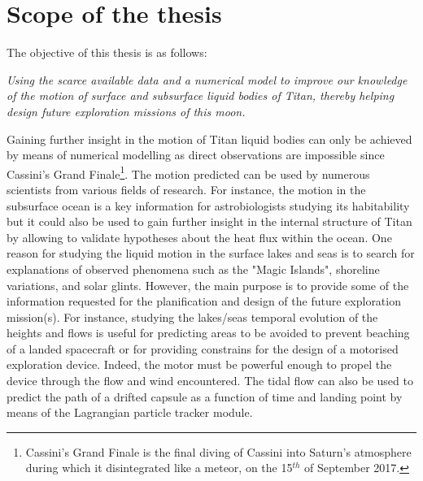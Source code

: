 \section{Scope of the thesis}
\label{sec:intro:scope}
The objective of this thesis is as follows:
\vspace{0.3cm}
\begin{adjustwidth}{25pt}{25pt}
\textit{Using the scarce available data and a numerical model to improve our knowledge of the motion of surface and subsurface liquid bodies of Titan, thereby helping design future exploration missions of this moon.}
\end{adjustwidth}
\vspace{0.3cm}
Gaining further insight in the motion of Titan liquid bodies can only be achieved by means of numerical modelling as direct observations are impossible since Cassini's Grand Finale\footnote{Cassini's Grand Finale is the final diving of Cassini into Saturn's atmosphere during which it disintegrated like a meteor, on the 15$^{th}$ of September 2017.}. The motion predicted can be used by numerous scientists from various fields of research. For instance, the motion in the subsurface ocean is a key information for astrobiologists studying its habitability but it could also be used to gain further insight in the internal structure of Titan by allowing to validate hypotheses about the heat flux within the ocean. One reason for studying the liquid motion in the surface lakes and seas is to search for explanations of observed phenomena such as the "Magic Islands", shoreline variations, and solar glints. However, the main purpose is to provide some of the information requested for the planification and design of the future exploration mission(s). For instance, studying the lakes/seas temporal evolution of the heights and flows is useful for predicting areas to be avoided to prevent beaching of a landed spacecraft or for providing constrains for the design of a motorised exploration device. Indeed, the motor must be powerful enough to propel the device through the flow and wind encountered. The tidal flow can also be used to predict the path of a drifted capsule as a function of time and landing point by means of the Lagrangian particle tracker module.



